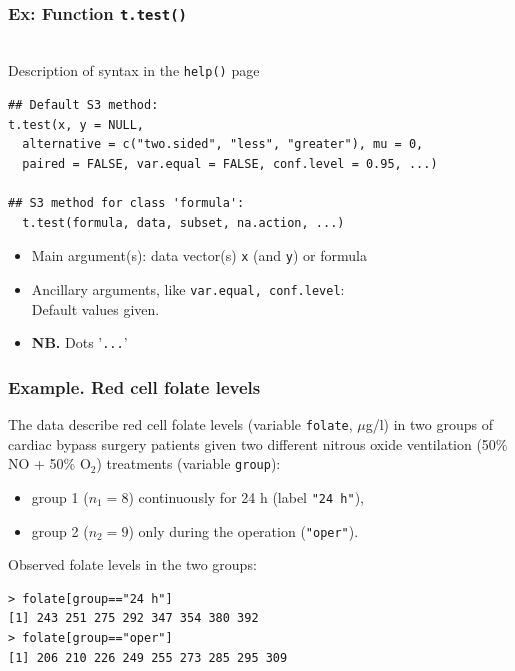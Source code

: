 \documentclass[handout,12pt]{beamer}
\begin{document}
\begin{frame}[fragile]
\frametitle{Ex: Function {\tt t.test()}}

\ \\
Description of syntax in the {\tt help()} page
\small
\begin{verbatim}
## Default S3 method:
t.test(x, y = NULL,
  alternative = c("two.sided", "less", "greater"), mu = 0,
  paired = FALSE, var.equal = FALSE, conf.level = 0.95, ...)
     
## S3 method for class 'formula':
  t.test(formula, data, subset, na.action, ...)
\end{verbatim}
\normalsize
\begin{itemize}
\item
Main argument(s): data vector(s) {\tt x} (and {\tt y}) or formula
\item
Ancillary arguments, like {\tt var.equal, conf.level}: \\
Default values given. 
\item
{\bf NB.} Dots '{\tt ...}'
\end{itemize}
\end{frame} 



\begin{frame}[fragile]
\frametitle{Example. Red cell folate levels}

 The data describe red cell folate levels (variable \texttt{folate},
$\mu$g/l) in two groups  
of cardiac bypass surgery patients given two different 
nitrous oxide ventilation (50\% NO + 50\% O$_2$) treatments
(variable \texttt{group}):
\begin{itemize}
\item
group 1 ($n_1 = 8$)
continuously for 24 h (label \texttt{"24 h"}),
\item
 group 2 ($n_2 = 9$)
 only during the operation (\texttt{"oper"}).
\end{itemize}
Observed folate levels in the two groups:
\begin{verbatim}
> folate[group=="24 h"]
[1] 243 251 275 292 347 354 380 392
> folate[group=="oper"]
[1] 206 210 226 249 255 273 285 295 309

\end{verbatim}

\end{frame}
\end{document}
